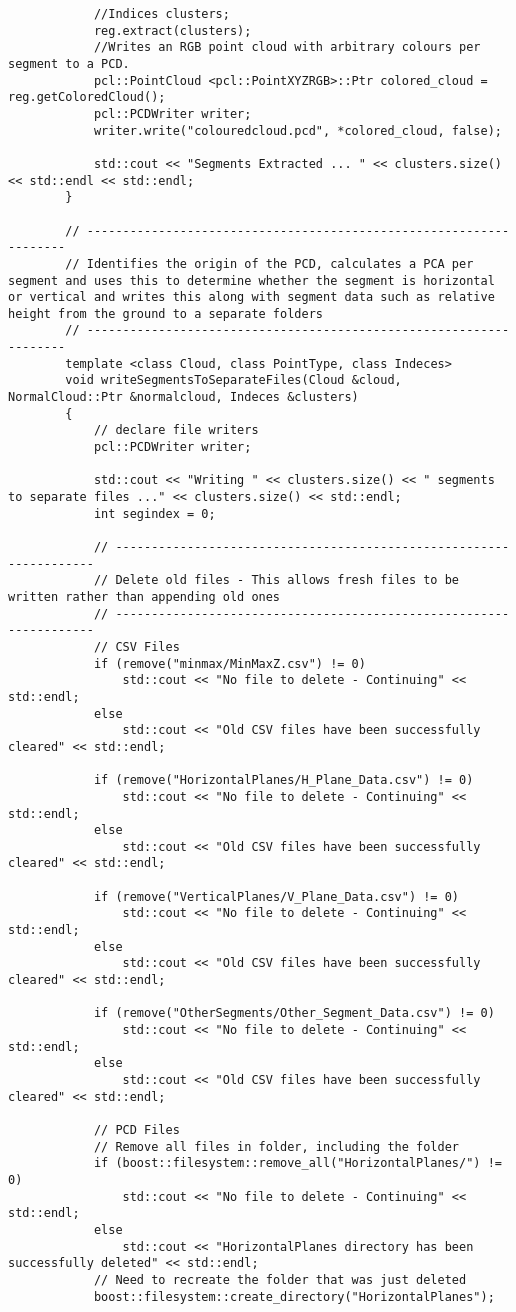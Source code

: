 \begin{lstlisting}
			//Indices clusters;
			reg.extract(clusters);
			//Writes an RGB point cloud with arbitrary colours per segment to a PCD.
			pcl::PointCloud <pcl::PointXYZRGB>::Ptr colored_cloud = reg.getColoredCloud();
			pcl::PCDWriter writer;
			writer.write("colouredcloud.pcd", *colored_cloud, false);

			std::cout << "Segments Extracted ... " << clusters.size() << std::endl << std::endl;
		}

		// -------------------------------------------------------------------
		// Identifies the origin of the PCD, calculates a PCA per segment and uses this to determine whether the segment is horizontal or vertical and writes this along with segment data such as relative height from the ground to a separate folders
		// -------------------------------------------------------------------
		template <class Cloud, class PointType, class Indeces>
		void writeSegmentsToSeparateFiles(Cloud &cloud, NormalCloud::Ptr &normalcloud, Indeces &clusters)
		{
			// declare file writers
			pcl::PCDWriter writer;

			std::cout << "Writing " << clusters.size() << " segments to separate files ..." << clusters.size() << std::endl;
			int segindex = 0;
			
			// -------------------------------------------------------------------
			// Delete old files - This allows fresh files to be written rather than appending old ones
			// -------------------------------------------------------------------
			// CSV Files
			if (remove("minmax/MinMaxZ.csv") != 0)
				std::cout << "No file to delete - Continuing" << std::endl;
			else
				std::cout << "Old CSV files have been successfully cleared" << std::endl;

			if (remove("HorizontalPlanes/H_Plane_Data.csv") != 0)
				std::cout << "No file to delete - Continuing" << std::endl;
			else
				std::cout << "Old CSV files have been successfully cleared" << std::endl;

			if (remove("VerticalPlanes/V_Plane_Data.csv") != 0)
				std::cout << "No file to delete - Continuing" << std::endl;
			else
				std::cout << "Old CSV files have been successfully cleared" << std::endl;

			if (remove("OtherSegments/Other_Segment_Data.csv") != 0)
				std::cout << "No file to delete - Continuing" << std::endl;
			else
				std::cout << "Old CSV files have been successfully cleared" << std::endl;

			// PCD Files
			// Remove all files in folder, including the folder
			if (boost::filesystem::remove_all("HorizontalPlanes/") != 0)
				std::cout << "No file to delete - Continuing" << std::endl;
			else
				std::cout << "HorizontalPlanes directory has been successfully deleted" << std::endl;
			// Need to recreate the folder that was just deleted
			boost::filesystem::create_directory("HorizontalPlanes");


\end{lstlisting}
